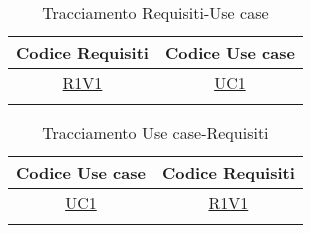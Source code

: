 \normalsize
\begin{longtable}{|c|c|}
\hline
\textbf{Codice Requisiti} & \textbf{Codice Use case} \\
\hline
\endhead
\hyperlink{R1V1}{R1V1} & \hyperlink{UC1}{UC1}\\
\hline
\caption[Tracciamento Requisiti-Use case]{Tracciamento Requisiti-Use case}
\label{tabella:requi-usecase}
\end{longtable}
\clearpage
\normalsize
\begin{longtable}{|c|c|}
\hline
\textbf{Codice Use case} & \textbf{Codice Requisiti} \\
\hline
\endhead
\hyperlink{UC1}{UC1} & \hyperlink{R1V1}{R1V1}\\
\hline
\caption[Tracciamento Use case-Requisiti]{Tracciamento Use case-Requisiti}
\label{tabella:requi-usecase}
\end{longtable}
\clearpage
